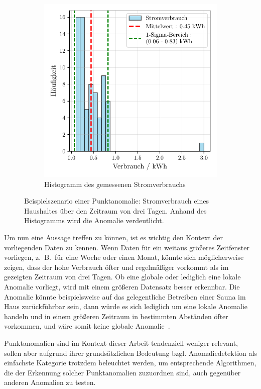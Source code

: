 \begin{figure}[!t]
\begin{subfigure}[b]{0.49\linewidth}
        \includegraphics[width=\linewidth]{ch5_anomalien/abbildungen/punktanomalie_hist.pdf}
        \caption{\centering Histogramm des gemessenen Stromverbrauchs}\label{subfig:smartmeter_histogramm}
    \end{subfigure}
    \caption{\centering Beispielszenario einer Punktanomalie: Stromverbrauch eines Haushaltes über den Zeitraum von
    drei Tagen. Anhand des Histogramms wird die Anomalie verdeutlicht.}\label{fig:punktanomalie}
\end{figure}

Um nun eine Aussage treffen zu können, ist es wichtig den Kontext der vorliegenden Daten zu kennen. Wenn Daten für ein weitaus größeres
Zeitfenster vorliegen, z.~B.~für eine Woche oder einen Monat, könnte sich möglicherweise zeigen, dass der hohe Verbrauch öfter und
regelmäßiger vorkommt als im gezeigten Zeitraum von drei Tagen. Ob eine globale oder lediglich eine lokale Anomalie vorliegt, wird
mit einem größeren Datensatz besser erkennbar. Die Anomalie könnte beispielsweise auf das gelegentliche Betreiben einer Sauna im Haus
zurückführbar sein, dann würde es sich lediglich um eine lokale Anomalie handeln und in einem größeren Zeitraum in bestimmten Abständen
öfter vorkommen, und wäre somit keine globale Anomalie~\Cite[Kap.~10]{Tan2014}.

Punktanomalien sind im Kontext dieser Arbeit tendenziell weniger relevant, sollen aber aufgrund ihrer grundsätzlichen Bedeutung bzgl.
Anomaliedetektion als einfachste Kategorie trotzdem beleuchtet werden, um entsprechende Algorithmen, die der Erkennung solcher
Punktanomalien zuzuordnen sind, auch gegenüber anderen Anomalien zu testen.


